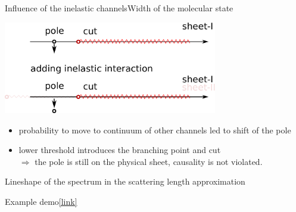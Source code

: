 \documentclass[aspectratio=169]{beamer}
\begin{document}
\begin{frame}{Influence of the inelastic channels}{Width of the molecular state}
    \begin{center}
        \includegraphics[width=0.7\textwidth]{figs/PcJPAC/pole_cut_inelastic.pdf}
    \end{center}
    \begin{itemize}
        \item probability to move to continuum of other channels led to shift of the pole
        \item lower threshold introduces the branching point and cut\\
        $\Rightarrow$ the pole is still on the physical sheet, causality is not violated.
    \end{itemize}
\end{frame}

\begin{frame}{Lineshape of the spectrum in the scattering length approximation}
\begin{center}
    \Huge Example demo\quad\href{https://hub.gke.mybinder.org/user/mmikhasenko-201-rons-manchester-f5b9ueb0/apps/Examples/lineshape_and_poleposition_in_SLA.ipynb}{\color{orange}[link]}\\[1cm]
    \qquad
    \\
\end{center}
\end{frame}
\end{document}
